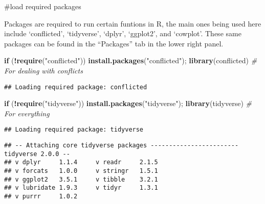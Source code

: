 \documentclass[
]{article}
\newenvironment{Shaded}{\begin{snugshade}}{\end{snugshade}}
\newcommand{\CommentTok}[1]{\textcolor[rgb]{0.56,0.35,0.01}{\textit{#1}}}
\newcommand{\ControlFlowTok}[1]{\textcolor[rgb]{0.13,0.29,0.53}{\textbf{#1}}}
\newcommand{\FunctionTok}[1]{\textcolor[rgb]{0.13,0.29,0.53}{\textbf{#1}}}
\newcommand{\NormalTok}[1]{#1}
\newcommand{\SpecialCharTok}[1]{\textcolor[rgb]{0.81,0.36,0.00}{\textbf{#1}}}
\newcommand{\StringTok}[1]{\textcolor[rgb]{0.31,0.60,0.02}{#1}}
\begin{document}
\#load required packages

Packages are required to run certain funtions in R, the main ones being
used here include `conflicted', `tidyverse', `dplyr', `ggplot2', and
`cowplot'. These same packages can be found in the ``Packages'' tab in
the lower right panel.

\begin{Shaded}
\begin{Highlighting}[]
\ControlFlowTok{if}\NormalTok{ (}\SpecialCharTok{!}\FunctionTok{require}\NormalTok{(}\StringTok{"conflicted"}\NormalTok{)) }\FunctionTok{install.packages}\NormalTok{(}\StringTok{"conflicted"}\NormalTok{); }\FunctionTok{library}\NormalTok{(conflicted) }\CommentTok{\# For dealing with conflicts}
\end{Highlighting}
\end{Shaded}

\begin{verbatim}
## Loading required package: conflicted
\end{verbatim}

\begin{Shaded}
\begin{Highlighting}[]
\ControlFlowTok{if}\NormalTok{ (}\SpecialCharTok{!}\FunctionTok{require}\NormalTok{(}\StringTok{"tidyverse"}\NormalTok{)) }\FunctionTok{install.packages}\NormalTok{(}\StringTok{"tidyverse"}\NormalTok{); }\FunctionTok{library}\NormalTok{(tidyverse) }\CommentTok{\# For everything}
\end{Highlighting}
\end{Shaded}

\begin{verbatim}
## Loading required package: tidyverse
\end{verbatim}

\begin{verbatim}
## -- Attaching core tidyverse packages ------------------------ tidyverse 2.0.0 --
## v dplyr     1.1.4     v readr     2.1.5
## v forcats   1.0.0     v stringr   1.5.1
## v ggplot2   3.5.1     v tibble    3.2.1
## v lubridate 1.9.3     v tidyr     1.3.1
## v purrr     1.0.2
\end{verbatim}
\end{document}
